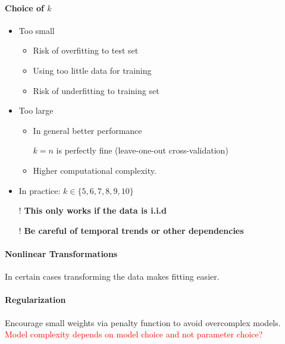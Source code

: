 \documentclass[10pt,a4paper]{scrartcl}
\begin{document}
\begin{multicols*}{2}
\paragraph{Choice of $k$}

\begin{itemize}
\item Too small
\begin{itemize}
\item Risk of overfitting to test set
\item Using too little data for training
\item Risk of underfitting to training set
\end{itemize}
\item Too large
\begin{itemize}
\item In general better performance

$k=n$ is perfectly fine (leave-one-out cross-validation)
\item Higher computational complexity.
\end{itemize}
\item In practice: $k\in\{5,6,7,8,9,10\}$
\item[!] \textbf{This only works if the data is i.i.d}
\item[!] \textbf{Be careful of temporal trends or other dependencies}
\end{itemize}

\paragraph{Nonlinear Transformations}

In certain cases transforming the data makes fitting easier.


\paragraph{Regularization}

Encourage small weights via penalty function to avoid overcomplex models. \textcolor{red}{Model complexity depends on model choice and not parameter choice?}



\end{multicols*}
\end{document}

